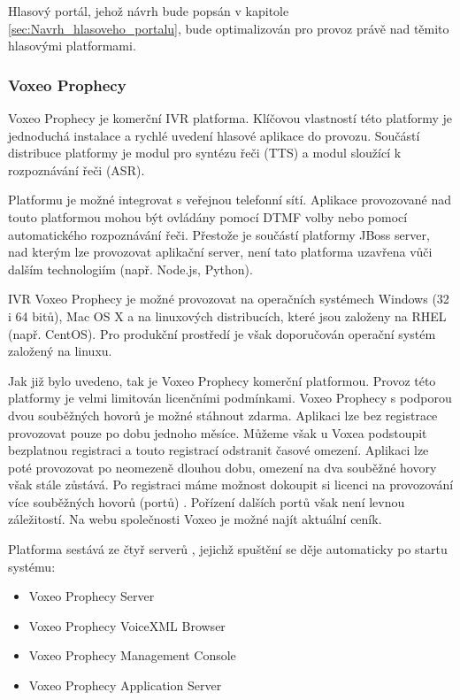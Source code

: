 \documentclass[ing,male,java,dept460]{diploma}						%
\begin{document}
Hlasový portál, jehož návrh bude popsán v kapitole \ref{sec:Navrh_hlasoveho_portalu}, bude optimalizován pro provoz právě nad těmito hlasovými platformami.

\subsubsection{Voxeo Prophecy}
\label{sec:Voxeo_interpreter}
Voxeo Prophecy je komerční IVR platforma. Klíčovou vlastností této platformy je jednoduchá instalace a rychlé uvedení hlasové aplikace do provozu. Součástí distribuce platformy je modul pro syntézu řeči (TTS) a modul sloužící k rozpoznávání řeči (ASR).

Platformu je možné integrovat s veřejnou telefonní sítí. Aplikace provozované nad touto platformou mohou být ovládány pomocí DTMF volby nebo pomocí automatického rozpoznávání řeči. Přestože je součástí platformy JBoss server, nad kterým lze provozovat aplikační server, není tato platforma uzavřena vůči dalším technologiím (např. Node.js, Python).

IVR Voxeo Prophecy je možné provozovat na operačních systémech Windows (32 i 64 bitů), Mac OS X a na linuxových distribucích, které jsou založeny na RHEL (např. CentOS). Pro produkční prostředí je však doporučován operační systém založený na linuxu.

Jak již bylo uvedeno, tak je Voxeo Prophecy komerční platformou. Provoz této platformy je velmi limitován licenčními podmínkami. Voxeo Prophecy s podporou dvou souběžných hovorů je možné stáhnout zdarma. Aplikaci lze bez registrace provozovat pouze po dobu jednoho měsíce. Můžeme však u Voxea podstoupit bezplatnou registraci a touto registrací odstranit časové omezení. Aplikaci lze poté provozovat po neomezeně dlouhou dobu, omezení na dva souběžné hovory však stále zůstává. Po registraci máme možnost dokoupit si licenci na provozování více souběžných hovorů (portů) \cite{vxml_org}. Pořízení dalších portů však není levnou záležitostí. Na webu společnosti Voxeo je možné najít aktuální ceník.

Platforma sestává ze čtyř serverů \cite{vxml_interpreters}, jejichž spuštění se děje automaticky po startu systému:

\begin{itemize}
\item Voxeo Prophecy Server
\item Voxeo Prophecy VoiceXML Browser
\item Voxeo Prophecy Management Console
\item Voxeo Prophecy Application Server
\end{itemize}
\end{document}
